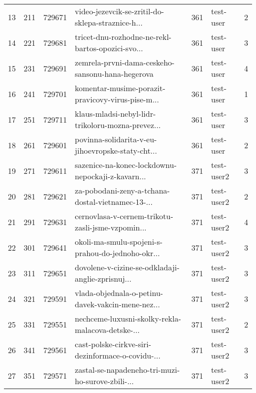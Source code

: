 \begin{tabular}{lrrlrlr}
13   &        211 &   729671 &  video-jezevcik-se-zritil-do-sklepa-straznice-h... &      361 &                    test-user &               2 \\
14   &        221 &   729681 &  tricet-dnu-rozhodne-ne-rekl-bartos-opozici-svo... &      361 &                    test-user &               3 \\
15   &        231 &   729691 &   zemrela-prvni-dama-ceskeho-sansonu-hana-hegerova &      361 &                    test-user &               4 \\
16   &        241 &   729701 &  komentar-musime-porazit-pravicovy-virus-pise-m... &      361 &                    test-user &               1 \\
17   &        251 &   729711 &  klaus-mladsi-nebyl-lidr-trikoloru-mozna-prevez... &      361 &                    test-user &               3 \\
18   &        261 &   729601 &  povinna-solidarita-v-eu-jihoevropske-staty-cht... &      361 &                    test-user &               2 \\
19   &        271 &   729611 &  sazenice-na-konec-lockdownu-nepockaji-z-kavarn... &      371 &                   test-user2 &               3 \\
20   &        281 &   729621 &  za-pobodani-zeny-a-tchana-dostal-vietnamec-13-... &      371 &                   test-user2 &               2 \\
21   &        291 &   729631 &  cernovlasa-v-cernem-trikotu-zasli-jsme-vzpomin... &      371 &                   test-user2 &               4 \\
22   &        301 &   729641 &  okoli-ma-smulu-spojeni-s-prahou-do-jednoho-okr... &      371 &                   test-user2 &               3 \\
23   &        311 &   729651 &  dovolene-v-cizine-se-odkladaji-anglie-zprisnuj... &      371 &                   test-user2 &               3 \\
24   &        321 &   729591 &  vlada-objednala-o-petinu-davek-vakcin-mene-nez... &      371 &                   test-user2 &               3 \\
25   &        331 &   729551 &  nechceme-luxusni-skolky-rekla-malacova-detske-... &      371 &                   test-user2 &               2 \\
26   &        341 &   729561 &  cast-polske-cirkve-siri-dezinformace-o-covidu-... &      371 &                   test-user2 &               3 \\
27   &        351 &   729571 &  zastal-se-napadeneho-tri-muzi-ho-surove-zbili-... &      371 &                   test-user2 &               3 \\

\end{tabular}
